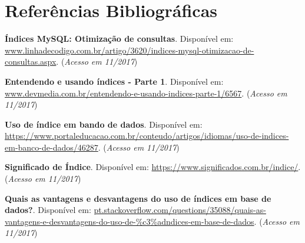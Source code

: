 \documentclass[12pt,a4paper]{article}
\begin{document}
\section{Referências Bibliográficas}
\noindent \textbf{Índices MySQL: Otimização de consultas}. Disponível em: \url {www.linhadecodigo.com.br/artigo/3620/indices-mysql-otimizacao-de-consultas.aspx}. (\textit{Acesso em 11/2017})\\\vspace{0.2cm}

\noindent \textbf{Entendendo e usando índices - Parte 1}. Disponível em: \url {www.devmedia.com.br/entendendo-e-usando-indices-parte-1/6567}. (\textit{Acesso em 11/2017})\\\vspace{0.2cm}

\noindent \textbf{Uso de índice em bando de dados}. Disponível em: \url {https://www.portaleducacao.com.br/conteudo/artigos/idiomas/uso-de-indices-em-banco-de-dados/46287}. (\textit{Acesso em 11/2017})\\\vspace{0.2cm}

\noindent \textbf{Significado de Índice}. Disponível em: \url {https://www.significados.com.br/indice/}. (\textit{Acesso em 11/2017})\\\vspace{0.2cm}

\noindent \textbf{Quais as vantagens e desvantagens do uso de índices em base de dados?}. Disponível em: \url {pt.stackoverflow.com/questions/35088/quais-as-vantagens-e-desvantagens-do-uso-de-\%c3\%adndices-em-base-de-dados}. (\textit{Acesso em 11/2017})
\end{document}

